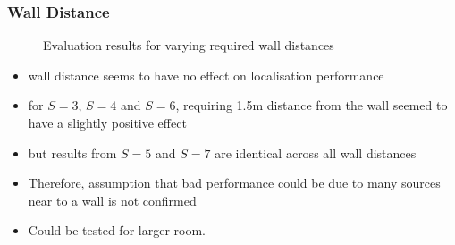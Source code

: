 \subsubsection{Wall Distance}

\begin{figure}[H]
	\begin{tikzpicture}
	    
	    
	\end{tikzpicture}
	\caption[Evaluation results for varying required wall distances]{Evaluation results for varying required wall distances}
	\label{fig:trial1}
\end{figure}

\begin{itemize}
    \item wall distance seems to have no effect on localisation performance
    \item for $S=3$, $S=4$ and $S=6$, requiring 1.5m distance from the wall seemed to have a slightly positive effect
    \item but results from $S=5$ and $S=7$ are identical across all wall distances
    \item Therefore, assumption that bad performance could be due to many sources near to a wall is not confirmed
    \item Could be tested for larger room.
\end{itemize}